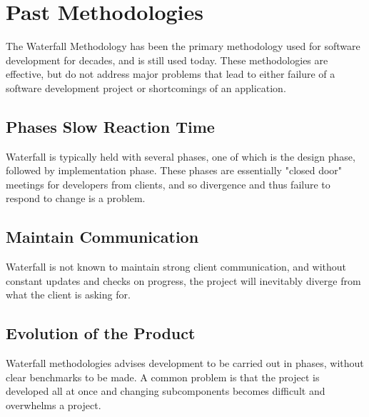 \documentclass[11pt]{article}
\begin{document}
\section{Past Methodologies}
The Waterfall Methodology has been the primary methodology used for software development for decades, and is still used today.
These methodologies are effective, but do not address major problems that lead to either failure of a software development
project or shortcomings of an application.

\subsection{Phases Slow Reaction Time}
Waterfall is typically held with several phases, one of which is the design phase, followed by implementation
phase. These phases are essentially "closed door" meetings for developers from clients, and so divergence and thus
failure to respond to change is a problem.

\subsection{Maintain Communication}
Waterfall is not known to maintain strong client communication, and without constant updates and checks on progress,
the project will inevitably diverge from what the client is asking for.

\subsection{Evolution of the Product}
Waterfall methodologies advises development to be carried out in phases, without clear benchmarks to be made. A common problem
is that the project is developed all at once and changing subcomponents becomes difficult and overwhelms a project.

\nocite{*}



\end{document}
